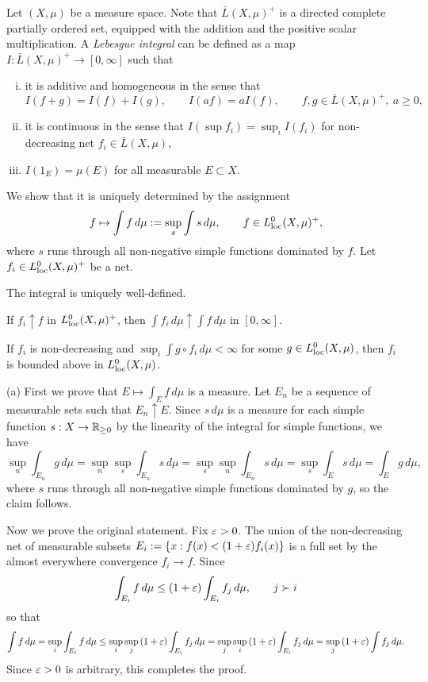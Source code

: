 \documentclass{../../large}
\begin{document}
\begin{prb}
Let $(X,\mu)$ be a measure space.
Note that $\bar L(X,\mu)^+$ is a directed complete partially ordered set, equipped with the addition and the positive scalar multiplication.
A \emph{Lebesgue integral} can be defined as a map $I:\bar L(X,\mu)^+\to[0,\infty]$ such that
\begin{enumerate}[(i)]
\item it is additive and homogeneous in the sense that
\[I(f+g)=I(f)+I(g),\qquad I(af)=aI(f),\qquad f,g\in\bar L(X,\mu)^+,\ a\ge0,\]
\item it is continuous in the sense that $I(\sup f_i)=\sup_iI(f_i)$ for non-decreasing net $f_i\in\bar L(X,\mu)$,
\item $I(1_E)=\mu(E)$ for all measurable $E\subset X$.
\end{enumerate}

We show that it is uniquely determined by the assignment
\[f\mapsto\int f\,d\mu:=\sup_s\int s\,d\mu,\qquad f\in L_{\mathrm{loc}}^0(X,\mu)^+,\]
where $s$ runs through all non-negative simple functions dominated by $f$.
Let $f_i\in L_{\mathrm{loc}}^0(X,\mu)^+$ be a net.
\begin{parts}
\item The integral is uniquely well-defined.
\item If $f_i\uparrow f$ in $L_{\mathrm{loc}}^0(X,\mu)^+$, then $\int f_i\,d\mu\uparrow\int f\,d\mu$ in $[0,\infty]$.
\item If $f_i$ is non-decreasing and $\sup_i\int g\circ f_i\,d\mu<\infty$ for some $g\in L_{\mathrm{loc}}^0(X,\mu)$, then $f_i$ is bounded above in $L_{\mathrm{loc}}^0(X,\mu)$.
\end{parts}
\end{prb}
\begin{pf}
(a)
First we prove that $E\mapsto\int_Ef\,d\mu$ is a measure.
Let $E_n$ be a sequence of measurable sets such that $E_n\uparrow E$.
Since $s\,d\mu$ is a measure for each simple function $s:X\to\mathbb{R}_{\ge0}$ by the linearity of the integral for simple functions, we have
\[\sup_n\int_{E_n}g\,d\mu=\sup_n\sup_s\int_{E_n}s\,d\mu=\sup_s\sup_n\int_{E_n}s\,d\mu=\sup_s\int_Es\,d\mu=\int_Eg\,d\mu,\]
where $s$ runs through all non-negative simple functions dominated by $g$, so the claim follows.

Now we prove the original statement.
Fix $\varepsilon>0$.
The union of the non-decreasing net of measurable subsets $E_i:=\{x:f(x)<(1+\varepsilon)f_i(x)\}$ is a full set by the almost everywhere convergence $f_i\to f$.
Since
\[\int_{E_i}f\,d\mu\le(1+\varepsilon)\int_{E_i}f_j\,d\mu,\qquad j\succ i\]
so that
\[\int f\,d\mu=\sup_i\int_{E_i}f\,d\mu\le\sup_i\sup_j\,(1+\varepsilon)\int_{E_i}f_j\,d\mu=\sup_j\sup_i\,(1+\varepsilon)\int_{E_i}f_j\,d\mu=\sup_j\,(1+\varepsilon)\int f_j\,d\mu.\]
Since $\varepsilon>0$ is arbitrary, this completes the proof.


\end{pf}
\end{document}
